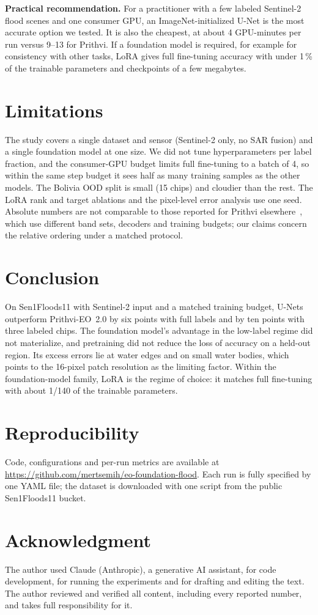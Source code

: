 \documentclass[conference]{IEEEtran}
\begin{document}
\textbf{Practical recommendation.} For a practitioner with a few labeled Sentinel-2 flood scenes and one consumer GPU, an ImageNet-initialized U-Net is the most accurate option we tested. It is also the cheapest, at about 4 GPU-minutes per run versus 9--13 for Prithvi. If a foundation model is required, for example for consistency with other tasks, LoRA gives full fine-tuning accuracy with under 1\,\% of the trainable parameters and checkpoints of a few megabytes.

\section{Limitations}
The study covers a single dataset and sensor (Sentinel-2 only, no SAR fusion) and a single foundation model at one size. We did not tune hyperparameters per label fraction, and the consumer-GPU budget limits full fine-tuning to a batch of 4, so within the same step budget it sees half as many training samples as the other models. The Bolivia OOD split is small (15 chips) and cloudier than the rest. The LoRA rank and target ablations and the pixel-level error analysis use one seed. Absolute numbers are not comparable to those reported for Prithvi elsewhere~\cite{szwarcman2024prithvi}, which use different band sets, decoders and training budgets; our claims concern the relative ordering under a matched protocol.

\section{Conclusion}
On Sen1Floods11 with Sentinel-2 input and a matched training budget, U-Nets outperform Prithvi-EO~2.0 by six points with full labels and by ten points with three labeled chips. The foundation model's advantage in the low-label regime did not materialize, and pretraining did not reduce the loss of accuracy on a held-out region. Its excess errors lie at water edges and on small water bodies, which points to the 16-pixel patch resolution as the limiting factor. Within the foundation-model family, LoRA is the regime of choice: it matches full fine-tuning with about 1/140 of the trainable parameters.

\section*{Reproducibility}
Code, configurations and per-run metrics are available at \url{https://github.com/mertsemih/eo-foundation-flood}. Each run is fully specified by one YAML file; the dataset is downloaded with one script from the public Sen1Floods11 bucket.

\section*{Acknowledgment}
The author used Claude (Anthropic), a generative AI assistant, for code development, for running the experiments and for drafting and editing the text. The author reviewed and verified all content, including every reported number, and takes full responsibility for it.



\end{document}
